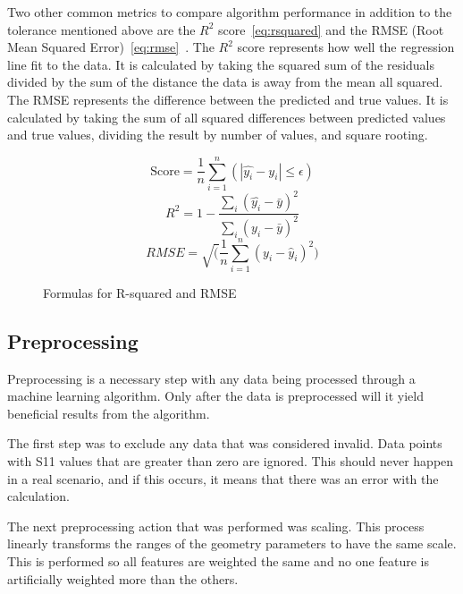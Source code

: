 \documentclass[lettersize,journal]{IEEEtran}
\begin{document}
Two other common metrics to compare algorithm performance in addition to the tolerance mentioned above are the $R^2$ score~\eqref{eq:rsquared} and the RMSE (Root Mean Squared Error)~\eqref{eq:rmse}~\cite{haque_machine_2023,m_el-kenawy_optimized_2022}. The $R^2$ score represents how well the regression line fit to the data. It is calculated by taking the squared sum of the residuals divided by the sum of the distance the data is away from the mean all squared. The RMSE represents the difference between the predicted and true values. It is calculated by taking the sum of all squared differences between predicted values and true values, dividing the result by number of values, and square rooting.

\begin{figure}[h]
    \begin{equation}
        \text{Score} = \frac{1}{n} \sum_{i=1}^{n}(\left|\hat{y_i} - y_i\right| \leq \epsilon)
        \label{eq:tolerance}
    \end{equation}
    \begin{equation}
        R^2 = 1 - \frac{\sum_{i}(\hat{y_i} - \bar{y})^2}{\sum_{i}(y_i - \bar{y})^2}
        \label{eq:rsquared}
    \end{equation}
    \begin{equation}
        {RMSE} = \sqrt(\frac{1}{n} \sum_{i=1}^{n}(y_i - \hat{y}_i)^2)
        \label{eq:rmse}
    \end{equation}
    \caption{Formulas for R-squared and RMSE}
\end{figure}


\subsection{Preprocessing}
Preprocessing is a necessary step with any data being processed through a machine learning algorithm. Only after the data is preprocessed will it yield beneficial results from the algorithm.

The first step was to exclude any data that was considered invalid. Data points with S11 values that are greater than zero are ignored. This should never happen in a real scenario, and if this occurs, it means that there was an error with the calculation. 

The next preprocessing action that was performed was scaling. This process linearly transforms the ranges of the geometry parameters to have the same scale. This is performed so all features are weighted the same and no one feature is artificially weighted more than the others.
\end{document}
